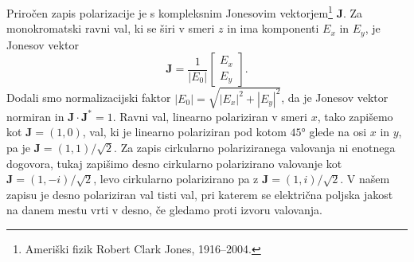 Priročen zapis polarizacije je s kompleksnim Jonesovim 
vektorjem\footnote{Ameriški fizik Robert Clark Jones, 1916--2004.}
$\mathbf{J}$. Za monokromatski ravni val, ki se širi v smeri $z$ in ima 
komponenti $E_x$ in $E_y$, je Jonesov vektor
\begin{equation}
\mathbf{J}=\frac{1}{|E_{0}|}\left[\begin{array}{c}
E_{x}\\
E_{y}
\end{array}\right].
\end{equation}
Dodali smo normalizacijski faktor $|E_{0}|=\sqrt{|E_{x}|^{2}+|E_{y}|^{2}}$,
da je Jonesov vektor normiran in $\mathbf{J}\cdot\mathbf{J}^{*}=1$.
Ravni val, linearno polariziran v smeri $x$, tako zapišemo kot $\mathbf{J}=\left(1,0\right)$,
val, ki je linearno polariziran pod kotom $\ang{45}$ glede na osi
$x$ in $y$, pa je $\mathbf{J}=\left(1,1\right)/\sqrt{2}$.
Za zapis cirkularno polariziranega valovanja ni enotnega dogovora, tukaj zapišimo
desno cirkularno polarizirano valovanje kot 
$\mathbf{J}=\left(1,-i\right)/\sqrt{2}$,
levo cirkularno polarizirano pa z $\mathbf{J}=\left(1,i\right)/\sqrt{2}$.
V našem zapisu je desno polariziran val tisti val, pri katerem se električna
poljska jakost na danem mestu vrti v desno, če gledamo proti izvoru valovanja. 

